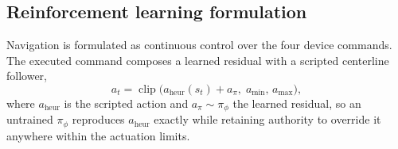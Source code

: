 %
%
%
%

\subsection{Reinforcement learning formulation}
\label{sec:rl}

Navigation is formulated as continuous control over the four device commands. The executed
command composes a learned residual with a scripted centerline follower,
%
\begin{equation}
a_t = \operatorname{clip}\!\big(a_{\mathrm{heur}}(s_t) + a_{\pi},\; a_{\min},\, a_{\max}\big),
\label{eq:residual}
\end{equation}
%
where $a_{\mathrm{heur}}$ is the scripted action and $a_{\pi}\sim\pi_{\phi}$ the learned residual,
so an untrained $\pi_{\phi}$ reproduces $a_{\mathrm{heur}}$ exactly while retaining authority to
override it anywhere within the actuation limits.

